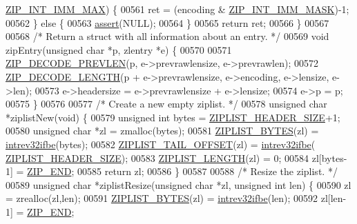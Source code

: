 \begin{DoxyCode}
{{      \hyperlink{ziplist_8c_a69ea30cd75038067a13d2151a1c741ad}{ZIP\_INT\_IMM\_MAX}) \{
00561         ret = (encoding & \hyperlink{ziplist_8c_a7f67361d1c0359f801c75c65b9a2b07e}{ZIP\_INT\_IMM\_MASK})-1;
00562     \} \textcolor{keywordflow}{else} \{
00563         \hyperlink{redisassert_8h_a993abaa2c168852c1592879472938781}{assert}(NULL);
00564     \}
00565     \textcolor{keywordflow}{return} ret;
00566 \}
00567 
00568 \textcolor{comment}{/* Return a struct with all information about an entry. */}
00569 \textcolor{keywordtype}{void} zipEntry(\textcolor{keywordtype}{unsigned} \textcolor{keywordtype}{char} *p, zlentry *e) \{
00570 
00571     \hyperlink{ziplist_8c_a3e5b2bc4707dc1097db2726494cc3728}{ZIP\_DECODE\_PREVLEN}(p, e->prevrawlensize, e->prevrawlen);
00572     \hyperlink{ziplist_8c_acdddca374b430c930d4b2d08f5de7a62}{ZIP\_DECODE\_LENGTH}(p + e->prevrawlensize, e->encoding, e->lensize, e->len);
00573     e->headersize = e->prevrawlensize + e->lensize;
00574     e->p = p;
00575 \}
00576 
00577 \textcolor{comment}{/* Create a new empty ziplist. */}
00578 \textcolor{keywordtype}{unsigned} \textcolor{keywordtype}{char} *ziplistNew(\textcolor{keywordtype}{void}) \{
00579     \textcolor{keywordtype}{unsigned} \textcolor{keywordtype}{int} bytes = \hyperlink{ziplist_8c_a3b8ef40d77ce00bcad424d0c07e2de95}{ZIPLIST\_HEADER\_SIZE}+1;
00580     \textcolor{keywordtype}{unsigned} \textcolor{keywordtype}{char} *zl = zmalloc(bytes);
00581     \hyperlink{ziplist_8c_a28b9c7884758bc2d52f204903a4bb642}{ZIPLIST\_BYTES}(zl) = \hyperlink{endianconv_8h_a4e85d9ae58a3b1e6ceaabfd4689002c7}{intrev32ifbe}(bytes);
00582     \hyperlink{ziplist_8c_adf2235d74c81861c85fb5d2ffa209397}{ZIPLIST\_TAIL\_OFFSET}(zl) = \hyperlink{endianconv_8h_a4e85d9ae58a3b1e6ceaabfd4689002c7}{intrev32ifbe}(
      \hyperlink{ziplist_8c_a3b8ef40d77ce00bcad424d0c07e2de95}{ZIPLIST\_HEADER\_SIZE});
00583     \hyperlink{ziplist_8c_a6d779e84aca736e354768fcf87393b98}{ZIPLIST\_LENGTH}(zl) = 0;
00584     zl[bytes-1] = \hyperlink{ziplist_8c_a31a8f9d5b5bad75318741cfca5de5ea8}{ZIP\_END};
00585     \textcolor{keywordflow}{return} zl;
00586 \}
00587 
00588 \textcolor{comment}{/* Resize the ziplist. */}
00589 \textcolor{keywordtype}{unsigned} \textcolor{keywordtype}{char} *ziplistResize(\textcolor{keywordtype}{unsigned} \textcolor{keywordtype}{char} *zl, \textcolor{keywordtype}{unsigned} \textcolor{keywordtype}{int} len) \{
00590     zl = zrealloc(zl,len);
00591     \hyperlink{ziplist_8c_a28b9c7884758bc2d52f204903a4bb642}{ZIPLIST\_BYTES}(zl) = \hyperlink{endianconv_8h_a4e85d9ae58a3b1e6ceaabfd4689002c7}{intrev32ifbe}(len);
00592     zl[len-1] = \hyperlink{ziplist_8c_a31a8f9d5b5bad75318741cfca5de5ea8}{ZIP\_END};
}}
\end{DoxyCode}
